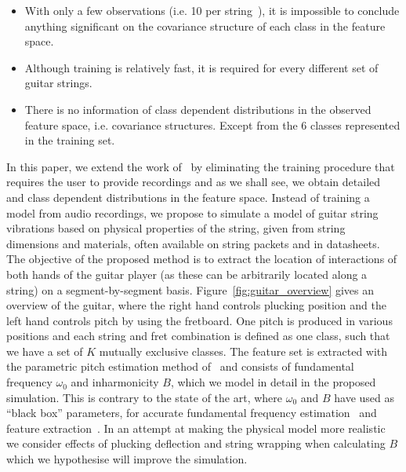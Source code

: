 \documentclass{article}
\begin{document}
\begin{sloppy}
\begin{itemize}
    \item With only a few observations (i.e. 10 per string~\cite{hjerrild::icassp19}), it is impossible to conclude anything significant on the covariance structure of each class in the feature space.
    \item Although training is relatively fast, it is required for every different set of guitar strings.
        \item There is no information of class dependent distributions in the observed feature space, i.e. covariance structures. Except from the 6 classes represented in the training set.
\end{itemize}
In this paper, we extend the work of~\cite{hjerrild::icassp19} by eliminating the training procedure that requires the user to provide recordings and as we shall see, we obtain detailed and class dependent distributions in the feature space. Instead of training a model from audio recordings, we propose to simulate a model of guitar string vibrations based on physical properties of the string, given from string dimensions and materials, often available on string packets and in datasheets. %
The objective of the proposed method is to extract the location of interactions of both hands of the guitar player (as these can be arbitrarily located along a string) on a segment-by-segment basis. %
Figure~\ref{fig:guitar_overview} gives an overview of the guitar, where the right hand controls plucking position and the left hand controls pitch by using the fretboard. One pitch is produced in various positions and each string and fret combination is defined as one class, such that we have a set of $K$ mutually exclusive classes. The feature set is extracted with the parametric pitch estimation method of~\cite{hjerrild::icassp19} and consists of fundamental frequency $\omega_0$ and inharmonicity $B$, which we model in detail in the proposed simulation. This is contrary to the state of the art, where $\omega_0$ and $B$ have used as ``black box'' parameters, for accurate fundamental frequency estimation~\cite{galembo1994measuring, nillson:multipitch_inharmonic_signals} and feature extraction~\cite{michelson2018_aes,abesser2012feature,barbancho:inharmonicity_tablature}. In an attempt at making the physical model more realistic we consider effects of plucking deflection and string wrapping when calculating $B$ which we hypothesise will improve the simulation.
%
%


\end{sloppy}
\end{document}
